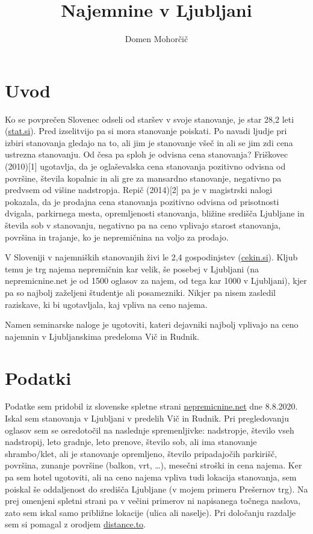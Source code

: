 \documentclass[a4paper, 12pt]{article}
\begin{document}
\title{Najemnine v Ljubljani}
\author{Domen Mohorčič}
\maketitle

\section{Uvod}

Ko se povprečen Slovenec odseli od staršev v svoje stanovanje, je star 28,2
leti (\href{https://www.stat.si/statweb/News/Index/7570}{stat.si}). Pred
izselitvijo pa si mora stanovanje poiskati. Po navadi ljudje pri izbiri
stanovanja gledajo na to, ali jim je stanovanje všeč in ali se jim zdi cena
ustrezna stanovanju. Od česa pa sploh je odvisna cena stanovanja? Friškovec
(2010)[1] ugotavlja, da je oglaševalska cena stanovanja
pozitivno odvisna od površine, števila kopalnic in ali gre za mansardno
stanovanje, negativno pa predvsem od višine nadstropja. Repič (2014)[2] pa je
v magistrski nalogi pokazala, da je prodajna cena stanovanja pozitivno odvisna
od prisotnosti dvigala, parkirnega mesta, opremljenosti stanovanja, bližine
središča Ljubljane in števila sob v stanovanju, negativno pa na ceno vplivajo
starost stanovanja, površina in trajanje, ko je nepremičnina na voljo za
prodajo.

V Sloveniji v najemniških stanovanjih živi le 2,4
gospodinjstev (\href{https://cekin.si/nepremicnine/trnova-pot-do-lastnega-doma-zakaj-mora-biti-tako.html}{cekin.si}).
Kljub temu je trg najema nepremičnin kar velik, še posebej v Ljubljani (na
nepremicnine.net je od 1500 oglasov za najem, od tega kar 1000 v Ljubljani),
kjer pa so najbolj zaželjeni študentje ali posamezniki. Nikjer pa nisem
zasledil raziskave, ki bi ugotavljala, kaj vpliva na ceno najema.

Namen seminarske naloge je ugotoviti, kateri dejavniki najbolj vplivajo na ceno
najemnin v Ljubljanskima predeloma Vič in Rudnik.

\section{Podatki}

Podatke sem pridobil iz slovenske spletne strani
\href{https://www.nepremicnine.net}{nepremicnine.net} dne 8.8.2020.
Iskal sem stanovanja v Ljubljani v predelih Vič in Rudnik.
Pri pregledovanju oglasov sem se osredotočil na naslednje spremenljivke:
nadstropje, število vseh nadstropij, leto gradnje, leto prenove, število sob,
ali ima stanovanje shrambo/klet, ali je stanovanje opremljeno, število
pripadajočih parkirišč, površina, zunanje površine (balkon, vrt, \dots),
mesečni stroški in cena najema. Ker pa sem hotel ugotoviti, ali
na ceno najema vpliva tudi lokacija stanovanja, sem poiskal še oddaljenost
do središča Ljubljane (v mojem primeru Prešernov trg). Na prej omenjeni spletni
strani pa v večini primerov ni napisanega točnega naslova, zato sem iskal samo
približne lokacije (ulica ali naselje). Pri določanju razdalje sem si pomagal
z orodjem \href{https://www.distance.to/}{distance.to}.
\end{document}
